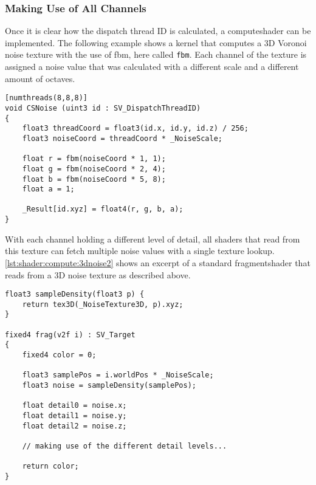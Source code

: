 \begin{figure}[H]
\begin{minipage}{0.47\linewidth}
        \label{img:tikz:compute:threads2}
    \end{minipage}
\end{figure}

\pagebreak

\subsubsection{Making Use of All Channels}
Once it is clear how the dispatch thread ID is calculated, a \gls{computeshader} can be implemented.
The following example shows a \gls{kernel} that computes a 3D Voronoi \gls{noise} texture with the use of \gls{fbm}, here called \lstinline[language=HLSL]{fbm}.
Each channel of the texture is assigned a \gls{noise} value that was calculated with a different scale and a different amount of octaves.

\begin{lstlisting}[language=HLSL, caption=An implementation of a 3D \gls{noise} \gls{computeshader}., label=lst:shader:compute:3dnoise]
[numthreads(8,8,8)]
void CSNoise (uint3 id : SV_DispatchThreadID)
{
    float3 threadCoord = float3(id.x, id.y, id.z) / 256;
    float3 noiseCoord = threadCoord * _NoiseScale;
    
    float r = fbm(noiseCoord * 1, 1);
    float g = fbm(noiseCoord * 2, 4);
    float b = fbm(noiseCoord * 5, 8);
    float a = 1;

    _Result[id.xyz] = float4(r, g, b, a);
}
\end{lstlisting}

\noindent
With each channel holding a different level of detail, all \gls{shader}s that read from this texture can fetch multiple \gls{noise} values with a single texture lookup.
\autoref{lst:shader:compute:3dnoise2} shows an excerpt of a standard \gls{fragmentshader} that reads from a 3D \gls{noise} texture as described above.
\begin{lstlisting}[language=HLSL, caption=An implementation of a shader making use of a 3D noise texture., label=lst:shader:compute:3dnoise2]
float3 sampleDensity(float3 p) {
    return tex3D(_NoiseTexture3D, p).xyz;
}

fixed4 frag(v2f i) : SV_Target
{
    fixed4 color = 0;

    float3 samplePos = i.worldPos * _NoiseScale;
    float3 noise = sampleDensity(samplePos);

    float detail0 = noise.x;
    float detail1 = noise.y;
    float detail2 = noise.z;

    // making use of the different detail levels...

    return color;
}
\end{lstlisting}